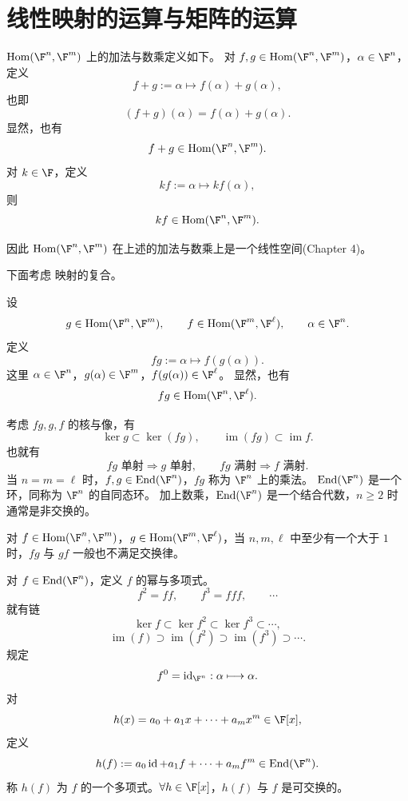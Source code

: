 \section{线性映射的运算与矩阵的运算}

\begin{definition}
	$\operatorname{Hom}(\F^n,\F^m)$ 上的加法与数乘定义如下。
	对 $f,g\in\operatorname{Hom}(\F^n,\F^m)$，$\alpha\in\F^n$，定义
	\[
	f+g:=\alpha\longmapsto f(\alpha)+g(\alpha),
	\]
	也即
	\[
	(f+g)(\alpha)=f(\alpha)+g(\alpha).
	\]
	显然，也有
	\[
	f+g\in\operatorname{Hom}(\F^n,\F^m).
	\]
	对 $k\in\F$，定义
	\[
	kf:=\alpha\longmapsto kf(\alpha),
	\]
	则
	\[
	kf\in\operatorname{Hom}(\F^n,\F^m).
	\]
	
\end{definition}
因此 $\operatorname{Hom}(\F^n,\F^m)$ 在上述的加法与数乘上是一个线性空间(Chapter 4)。

下面考虑
映射的复合。
\begin{definition}
	设
	\[
	g\in\operatorname{Hom}(\F^n,\F^m),\qquad
	f\in\operatorname{Hom}(\F^m,\F^\ell),\qquad
	\alpha\in\F^n.
	\]
	定义
	\[
	fg:=\alpha\longmapsto f(g(\alpha)).
	\]
	这里 $\alpha\in\F^n$，$g(\alpha)\in\F^m$，$f(g(\alpha))\in\F^\ell$。
	显然，也有
	\[
	fg\in\operatorname{Hom}(\F^n,\F^\ell).
	\]
	
\end{definition}
考虑 $fg,g,f$ 的核与像，有
\[
\ker g\subset \ker(fg),
\qquad
\operatorname{im}(fg)\subset \operatorname{im}f.
\]
也就有
\[
fg\text{ 单射}\Rightarrow g\text{ 单射},
\qquad
fg\text{ 满射}\Rightarrow f\text{ 满射}.
\]
当 $n=m=\ell$ 时，$f,g\in\operatorname{End}(\F^n)$，$fg$ 称为 $\F^n$ 上的乘法。
$\operatorname{End}(\F^n)$ 是一个环，同称为 $\F^n$ 的自同态环。
加上数乘，$\operatorname{End}(\F^n)$ 是一个结合代数，$n\geq 2$ 时通常是非交换的。

对 $f\in\operatorname{Hom}(\F^n,\F^m)$，$g\in\operatorname{Hom}(\F^m,\F^\ell)$，当 $n,m,\ell$ 中至少有一个大于 $1$ 时，$fg$ 与 $gf$ 一般也不满足交换律。
\begin{definition}
	对 $f\in\operatorname{End}(\F^n)$，定义 $f$ 的幂与多项式。
	\[
	f^2=ff,
	\qquad
	f^3=fff,
	\qquad \cdots
	\]
	就有链
	\[
	\ker f\subset \ker f^2\subset \ker f^3\subset\cdots,
	\]
	\[
	\operatorname{im}(f)\supset \operatorname{im}(f^2)\supset \operatorname{im}(f^3)\supset\cdots.
	\]
	规定
	\[
	f^0=\operatorname{id}_{\F^n}:\alpha\longmapsto \alpha.
	\]
	对
	\[
	h(x)=a_0+a_1x+\cdots+a_mx^m\in\F[x],
	\]
	定义
	\[
	h(f):=a_0\operatorname{id}+a_1f+\cdots+a_mf^m\in\operatorname{End}(\F^n).
	\]
	称 $h(f)$ 为 $f$ 的一个多项式。$\forall h\in\F[x]$，$h(f)$ 与 $f$ 是可交换的。
\end{definition}

